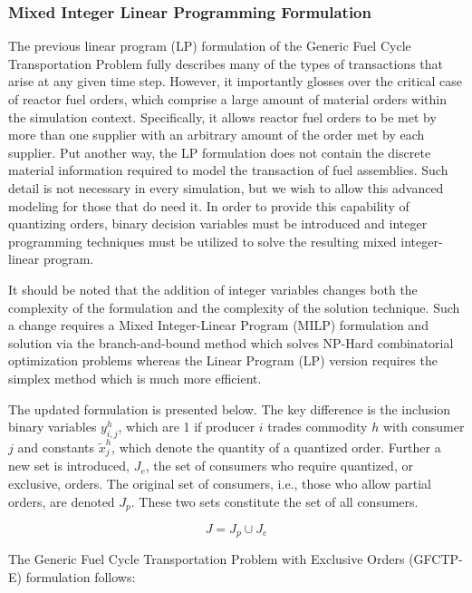 \subsubsection{Mixed Integer Linear Programming Formulation}\label{abm:dre:milp}

The previous linear program (LP) formulation of the Generic Fuel Cycle
Transportation Problem fully describes many of the types of transactions that
arise at any given time step. However, it importantly glosses over the critical
case of reactor fuel orders, which comprise a large amount of material orders
within the simulation context. Specifically, it allows reactor fuel orders to be
met by more than one supplier with an arbitrary amount of the order met by each
supplier. Put another way, the LP formulation does not contain the discrete
material information required to model the transaction of fuel assemblies. Such
detail is not necessary in every simulation, but we wish to allow this advanced
modeling for those that do need it. In order to provide this capability of
quantizing orders, binary decision variables must be introduced and integer
programming techniques must be utilized to solve the resulting mixed
integer-linear program. 

It should be noted that the addition of integer variables changes both the
complexity of the formulation and the complexity of the solution technique. Such
a change requires a Mixed Integer-Linear Program (MILP) formulation and solution
via the branch-and-bound method which solves NP-Hard combinatorial optimization
problems whereas the Linear Program (LP) version requires the simplex method
which is much more efficient.

The updated formulation is presented below. The key difference is the inclusion
binary variables $y_{i,j}^{h}$, which are 1 if producer $i$ trades commodity $h$
with consumer $j$ and constants $\tilde{x}_{j}^{h}$, which denote the quantity
of a quantized order. Further a new set is introduced, $J_{e}$, the set of
consumers who require quantized, or exclusive, orders. The original set of
consumers, i.e., those who allow partial orders, are denoted $J_{p}$. These two
sets constitute the set of all consumers.

\begin{equation}\label{eqs:consumer-union}
  J = J_{p} \cup J_{e}
\end{equation}

The Generic Fuel Cycle Transportation Problem with Exclusive Orders (GFCTP-E)
formulation follows:

